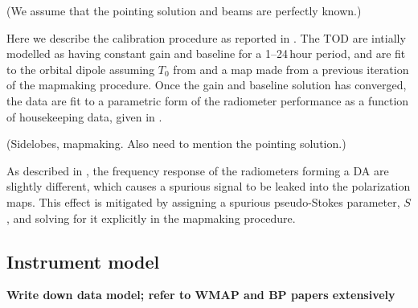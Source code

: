 \documentclass[twocolumn]{../../common/aa}
\begin{document}
(We assume that the pointing solution and beams are perfectly known.)

Here we describe the calibration procedure as reported in \citet{hinshaw2009}. The TOD are intially modelled as having constant gain and baseline for a 1--24\,hour period, and are fit to the orbital dipole assuming $T_0$ from \citet{mather:1999} and a map made from a previous iteration of the mapmaking procedure. Once the gain and baseline solution has converged, the data are fit to a parametric form of the radiometer performance as a function of housekeeping data, given in \citet{wmapexsupp}.

(Sidelobes, mapmaking. Also need to mention the pointing solution.)

As described in \citet{jarosik2007}, the frequency response of the radiometers forming a DA are slightly different, which causes a spurious signal to be leaked into the polarization maps. This effect is mitigated by assigning a spurious pseudo-Stokes parameter, $S$, and solving for it explicitly in the mapmaking procedure.

\subsection{Instrument model}
\label{sec:wmap_instmodel}

\textbf{Write down data model; refer to WMAP and BP papers extensively}
\end{document}
